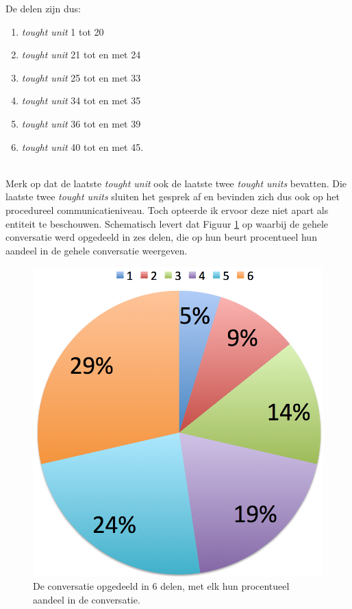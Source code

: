 \documentclass[a4paper,12pt]{article}
\theoremstyle{definition}
\begin{document}
De delen zijn dus:
\begin{enumerate}
  \item \emph{tought unit} 1 tot 20
 \item\emph{tought unit} 21 tot en met 24
 \item\emph{tought unit} 25 tot en met 33
\item\emph{tought unit} 34 tot en met 35
\item\emph{tought unit} 36 tot en met 39
\item\emph{tought unit} 40 tot en met 45. 
\end{enumerate}\\

Merk op dat de laatste \emph{tought unit} ook de laatste twee  \emph{tought units} 
bevatten. Die laatste twee \emph{tought units} sluiten het gesprek af en 
bevinden zich dus ook op het procedureel communicatieniveau. Toch opteerde ik 
ervoor deze niet apart als entiteit te beschouwen. Schematisch levert dat Figuur 
\ref{1} op waarbij de gehele conversatie werd opgedeeld in zes delen, die op hun beurt 
procentueel hun aandeel in de gehele conversatie weergeven.\\

\begin{figure}
  \centering
  \includegraphics[scale=0.6]{grafiek1.png}\caption{De conversatie opgedeeld in 6 delen, met elk hun procentueel aandeel in de conversatie.}
\label{1}
\end{figure}
\end{document}
